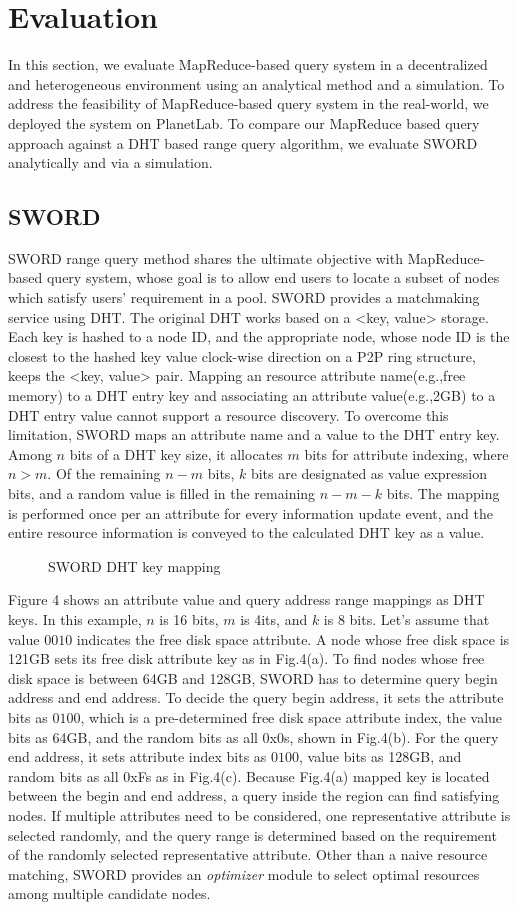\documentclass{acm_proc_article-sp}
\begin{document}
\section{Evaluation}
In this section, we evaluate MapReduce-based query system in a decentralized and heterogeneous environment using an analytical method and a simulation. 
To address the feasibility of MapReduce-based query system in the real-world, we deployed the system on PlanetLab. 
To compare our MapReduce based query approach against a DHT based range query algorithm, we evaluate SWORD\cite{sword} analytically and via a simulation.
\subsection{SWORD}
SWORD range query method shares the ultimate objective with MapReduce-based query system, whose goal is to allow end users to locate a subset of nodes which satisfy users' requirement in a pool.
SWORD provides a matchmaking service using DHT. The original DHT works based on a <key, value> storage. 
Each key is hashed to a node ID, and the appropriate node, whose node ID is the closest to the hashed key value clock-wise direction on a P2P ring structure\cite{chord}\cite{pastry}, keeps the <key, value> pair. 
Mapping an resource attribute name(e.g.,free memory) to a DHT entry key and associating an attribute value(e.g.,2GB) to a DHT entry value cannot support a resource discovery. 
To overcome this limitation, SWORD maps an attribute name and a value to the DHT entry key. Among $n$ bits of a DHT key size, it allocates $m$ bits for attribute indexing, where $n>m$. 
Of the remaining $n-m$ bits, $k$ bits are designated as value expression bits, and a random value is filled in the remaining $n-m-k$ bits.
The mapping is performed once per an attribute for every information update event, and the entire resource information is conveyed to the calculated DHT key as a value.
\begin{figure}
\centering
{}
\caption{SWORD DHT key mapping}
\end{figure}
Figure 4 shows an attribute value and query address range mappings as DHT keys. In this example, $n$ is 16 bits, $m$ is 4its, and $k$ is 8 bits. Let's assume that value $0010$ indicates the free disk space attribute.
A node whose free disk space is 121GB sets its free disk attribute key as in Fig.4(a).
To find nodes whose free disk space is between 64GB and 128GB, SWORD has to determine query begin address and end address. 
To decide the query begin address, it sets the attribute bits as $0100$, which is a pre-determined free disk space attribute index, the value bits as 64GB, and the random bits as all 0x0s, shown in Fig.4(b).
For the query end address, it sets attribute index bits as $0100$, value bits as 128GB, and random bits as all 0xFs as in Fig.4(c).
Because Fig.4(a) mapped key is located between the begin and end address, a query inside the region can find satisfying nodes. 
If multiple attributes need to be considered, one representative attribute is selected randomly, and the query range is determined based on the requirement of the randomly selected representative attribute.
Other than a naive resource matching, SWORD provides an \textit{optimizer} module to select optimal resources among multiple candidate nodes. 
\end{document}
